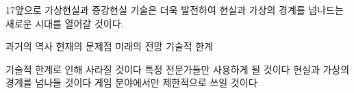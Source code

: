 \documentclass[fs85,seriesRus]{korfarm-base}
\begin{document}
\begin{kfSentenceUnit}{17}{앞으로 가상현실과 증강현실 기술은 더욱 발전하여 현실과 가상의 경계를 넘나드는 새로운 시대를 열어갈 것이다.}
\begin{kfChoices}
\kfChoice 과거의 역사
\kfChoice 현재의 문제점
\kfChoice 미래의 전망
\kfChoice 기술적 한계
\end{kfChoices}
\begin{kfChoices}
\kfChoice 기술적 한계로 인해 사라질 것이다
\kfChoice 특정 전문가들만 사용하게 될 것이다
\kfChoice 현실과 가상의 경계를 넘나들 것이다
\kfChoice 게임 분야에서만 제한적으로 쓰일 것이다
\end{kfChoices}
\end{kfSentenceUnit}

\kfEndMC
\end{document}
